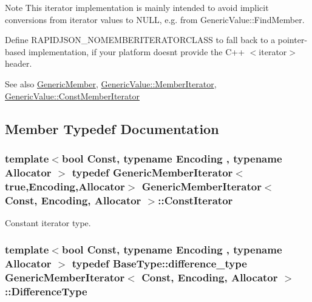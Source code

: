 \begin{DoxyNote}{Note}
This iterator implementation is mainly intended to avoid implicit conversions from iterator values to {\ttfamily N\+U\+LL}, e.\+g. from Generic\+Value\+::\+Find\+Member.

Define {\ttfamily R\+A\+P\+I\+D\+J\+S\+O\+N\+\_\+\+N\+O\+M\+E\+M\+B\+E\+R\+I\+T\+E\+R\+A\+T\+O\+R\+C\+L\+A\+SS} to fall back to a pointer-\/based implementation, if your platform doesn\textquotesingle{}t provide the C++ $<$iterator$>$ header.
\end{DoxyNote}
\begin{DoxySeeAlso}{See also}
\hyperlink{structGenericMember}{Generic\+Member}, \hyperlink{classGenericValue_a349b8faae61edc42b4289726820be439}{Generic\+Value\+::\+Member\+Iterator}, \hyperlink{classGenericValue_aac08c3e660a9036d3dcb8b10ff6c61f4}{Generic\+Value\+::\+Const\+Member\+Iterator} 
\end{DoxySeeAlso}


\subsection{Member Typedef Documentation}
\subsubsection[{\texorpdfstring{Const\+Iterator}{ConstIterator}}]{\setlength{\rightskip}{0pt plus 5cm}template$<$bool Const, typename Encoding , typename Allocator $>$ typedef {\bf Generic\+Member\+Iterator}$<$true,Encoding,Allocator$>$ {\bf Generic\+Member\+Iterator}$<$ Const, Encoding, Allocator $>$\+::{\bf Const\+Iterator}}\hypertarget{classGenericMemberIterator_ae5be27a73dce0be58ee2776db896d591}{}\label{classGenericMemberIterator_ae5be27a73dce0be58ee2776db896d591}


Constant iterator type. 

\subsubsection[{\texorpdfstring{Difference\+Type}{DifferenceType}}]{\setlength{\rightskip}{0pt plus 5cm}template$<$bool Const, typename Encoding , typename Allocator $>$ typedef Base\+Type\+::difference\+\_\+type {\bf Generic\+Member\+Iterator}$<$ Const, Encoding, Allocator $>$\+::{\bf Difference\+Type}}\hypertarget{classGenericMemberIterator_a902b99c8ae351cd7626514dc5f30740a}{}\label{classGenericMemberIterator_a902b99c8ae351cd7626514dc5f30740a}


